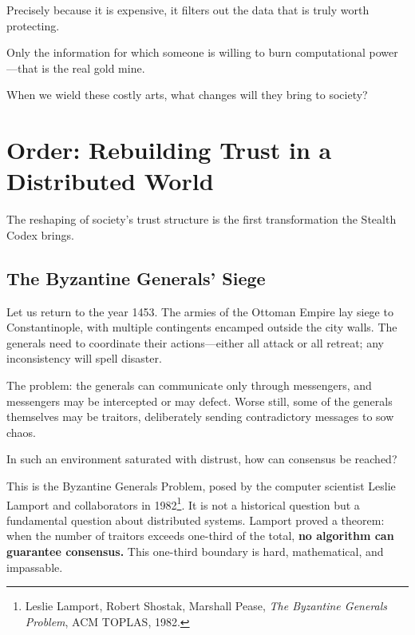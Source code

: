 Precisely because it is expensive, it filters out the data that is truly worth protecting.

Only the information for which someone is willing to burn computational power---that is the real gold mine.

\begin{thinkbox}[Reflection]
When we wield these costly arts, what changes will they bring to society?
\end{thinkbox}

\newpage
\section{Order: Rebuilding Trust in a Distributed World}
The reshaping of society's trust structure is the first transformation the Stealth Codex brings.

\subsection{The Byzantine Generals' Siege}

Let us return to the year 1453. The armies of the Ottoman Empire lay siege to Constantinople, with multiple contingents encamped outside the city walls. The generals need to coordinate their actions---either all attack or all retreat; any inconsistency will spell disaster.

The problem: the generals can communicate only through messengers, and messengers may be intercepted or may defect. Worse still, some of the generals themselves may be traitors, deliberately sending contradictory messages to sow chaos.

\vspace{1em}

In such an environment saturated with distrust, how can consensus be reached?

This is the Byzantine Generals Problem, posed by the computer scientist Leslie Lamport and collaborators in 1982\footnote{Leslie Lamport, Robert Shostak, Marshall Pease, \textit{The Byzantine Generals Problem}, ACM TOPLAS, 1982.}. It is not a historical question but a fundamental question about distributed systems. Lamport proved a theorem: when the number of traitors exceeds one-third of the total, \textbf{no algorithm can guarantee consensus.}
This one-third boundary is hard, mathematical, and impassable.

